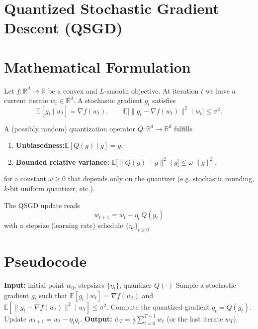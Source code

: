 \documentclass{article}
\newcommand{\EE}{\mathbb{E}}
\newcommand{\RR}{\mathbb{R}}
\begin{document}
\section*{Quantized Stochastic Gradient Descent (QSGD)}

\section*{Mathematical Formulation}
Let $f:\RR^{d}\to\RR$ be a convex and $L$‑smooth objective.  
At iteration $t$ we have a current iterate $w_t\in\RR^{d}$.  
A stochastic gradient $g_t$ satisfies 
\[
\EE[g_t\mid w_t]=\nabla f(w_t),\qquad 
\EE\big[\|g_t-\nabla f(w_t)\|^2\mid w_t\big]\le\sigma^2 .
\]

A (possibly random) quantization operator $Q:\RR^{d}\to\RR^{d}$ fulfills  

\begin{enumerate}[label=(\roman*)]
\item \textbf{Unbiasedness:}\quad $\EE[Q(g)\mid g]=g$,
\item \textbf{Bounded relative variance:}\quad 
$\EE\big[\|Q(g)-g\|^2\mid g\big]\le\omega\,\|g\|^2$,
\end{enumerate}
for a constant $\omega\ge0$ that depends only on the quantizer (e.g. stochastic rounding, $k$‑bit uniform quantizer, etc.).

The QSGD update reads
\begin{equation}
\boxed{w_{t+1}=w_t-\eta_t\,Q(g_t)}\label{eq:update}
\end{equation}
with a stepsize (learning rate) schedule $\{\eta_t\}_{t\ge0}$.

\section*{Pseudocode}
\begin{algorithm}[H]
\caption{Quantized Stochastic Gradient Descent (QSGD)}
\begin{algorithmic}[1]
\STATE \textbf{Input:} initial point $w_0$, stepsizes $\{\eta_t\}$, quantizer $Q(\cdot)$
    \STATE Sample a stochastic gradient $g_t$ such that 
    $\EE[g_t\mid w_t]=\nabla f(w_t)$ and $\EE[\|g_t-\nabla f(w_t)\|^2\mid w_t]\le\sigma^2$.
    \STATE Compute the quantized gradient $q_t = Q(g_t)$.
    \STATE Update $w_{t+1}=w_t-\eta_t q_t$.
\ENDFOR
\STATE \textbf{Output:} $\bar w_T=\frac1T\sum_{t=0}^{T-1}w_t$ (or the last iterate $w_T$).
\end{algorithmic}
\end{algorithm}
\end{document}
